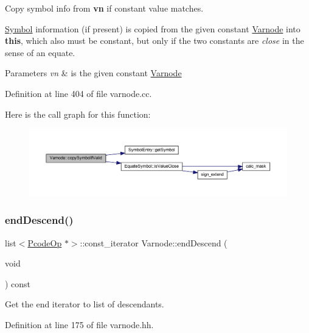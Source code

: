 Copy symbol info from {\bfseries{vn}} if constant value matches. 

\mbox{\hyperlink{class_symbol}{Symbol}} information (if present) is copied from the given constant \mbox{\hyperlink{class_varnode}{Varnode}} into {\bfseries{this}}, which also must be constant, but only if the two constants are {\itshape close} in the sense of an equate. 
\begin{DoxyParams}{Parameters}
{\em vn} & is the given constant \mbox{\hyperlink{class_varnode}{Varnode}} \\
\hline
\end{DoxyParams}


Definition at line 404 of file varnode.\+cc.

Here is the call graph for this function\+:
\nopagebreak
\begin{figure}[H]
\begin{center}
\leavevmode
\includegraphics[width=350pt]{class_varnode_a436ec606351beaa6fb2fe7dc1bb4312c_cgraph}
\end{center}
\end{figure}
\mbox{\label{class_varnode_a482e4fb67c20ad6bdf9141437866b8ea}} 
\subsubsection{\texorpdfstring{endDescend()}{endDescend()}}
{\footnotesize\ttfamily list$<$\mbox{\hyperlink{class_pcode_op}{Pcode\+Op}} $\ast$$>$\+::const\+\_\+iterator Varnode\+::end\+Descend (\begin{DoxyParamCaption}\item[{void}]{ }\end{DoxyParamCaption}) const\hspace{0.3cm}{\ttfamily [inline]}}



Get the end iterator to list of descendants. 



Definition at line 175 of file varnode.\+hh.

